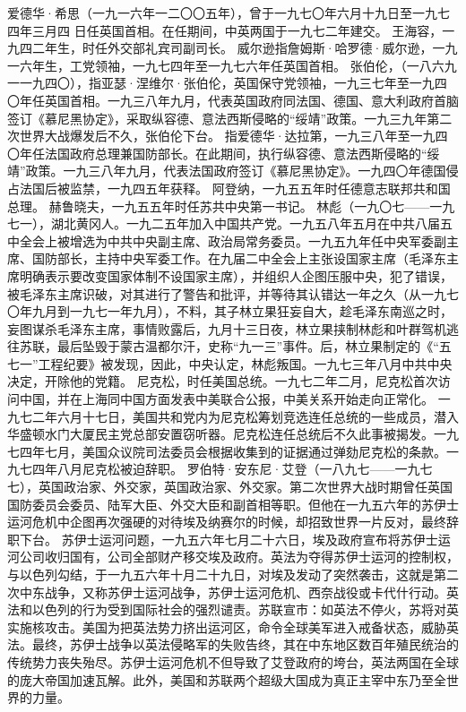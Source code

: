 \begin{maonote}
爱德华·希思（一九一六年一二〇〇五年），曾于一九七〇年六月十九日至一九七四年三月四 日任英国首相。在任期间，中英两国于一九七二年建交。
王海容，一九四二年生，时任外交部礼宾司副司长。
威尔逊指詹姆斯·哈罗德·威尔逊，一九一六年生，工党领袖，一九七四年至一九七六年任英国首相。
张伯伦，（一八六九一一九四〇），指亚瑟·涅维尔·张伯伦，英国保守党领袖，一九三七年至一九四〇年任英国首相。一九三八年九月，代表英国政府同法国、德国、意大利政府首脑签订《慕尼黑协定》，采取纵容德、意法西斯侵略的“绥靖”政策。一九三九年第二次世界大战爆发后不久，张伯伦下台。
指爱德华·达拉第，一九三八年至一九四〇年任法国政府总理兼国防部长。在此期间，执行纵容德、意法西斯侵略的“绥靖”政策。一九三八年九月，代表法国政府签订《慕尼黑协定》。一九四〇年德国侵占法国后被监禁，一九四五年获释。
阿登纳，一九五五年时任德意志联邦共和国总理。
赫鲁晓夫，一九五五年时任苏共中央第一书记。
林彪（一九〇七——一九七一），湖北黄冈人。一九二五年加入中国共产党。一九五八年五月在中共八届五中全会上被增选为中共中央副主席、政治局常务委员。一九五九年任中央军委副主席、国防部长，主持中央军委工作。在九届二中全会上主张设国家主席（毛泽东主席明确表示要改变国家体制不设国家主席），并组织人企图压服中央，犯了错误，被毛泽东主席识破，对其进行了警告和批评，并等待其认错达一年之久（从一九七〇年九月到一九七一年九月），不料，其子林立果狂妄自大，趁毛泽东南巡之时，妄图谋杀毛泽东主席，事情败露后，九月十三日夜，林立果挟制林彪和叶群驾机逃往苏联，最后坠毁于蒙古温都尔汗，史称“九一三”事件。后，林立果制定的《“五七一”工程纪要》被发现，因此，中央认定，林彪叛国。一九七三年八月中共中央决定，开除他的党籍。
尼克松，时任美国总统。一九七二年二月，尼克松首次访问中国，并在上海同中国方面发表中美联合公报，中美关系开始走向正常化。
一九七二年六月十七日，美国共和党内为尼克松筹划竞选连任总统的一些成员，潜入华盛顿水门大厦民主党总部安置窃听器。尼克松连任总统后不久此事被揭发。一九七四年七月，美国众议院司法委员会根据收集到的证据通过弹劾尼克松的条款。一九七四年八月尼克松被迫辞职。
罗伯特·安东尼·艾登（一八九七——一九七七），英国政治家、外交家，英国政治家、外交家。第二次世界大战时期曾任英国国防委员会委员、陆军大臣、外交大臣和副首相等职。但他在一九五六年的苏伊士运河危机中企图再次强硬的对待埃及纳赛尔的时候，却招致世界一片反对，最终辞职下台。
苏伊士运河问题，一九五六年七月二十六日，埃及政府宣布将苏伊士运河公司收归国有，公司全部财产移交埃及政府。英法为夺得苏伊士运河的控制权，与以色列勾结，于一九五六年十月二十九日，对埃及发动了突然袭击，这就是第二次中东战争，又称苏伊士运河战争，苏伊士运河危机、西奈战役或卡代什行动。英法和以色列的行为受到国际社会的强烈谴责。苏联宣市：如英法不停火，苏将对英实施核攻击。美国为把英法势力挤出运河区，命令全球美军进入戒备状态，威胁英法。最终，苏伊士战争以英法侵略军的失败告终，其在中东地区数百年殖民统治的传统势力丧失殆尽。苏伊士运河危机不但导致了艾登政府的垮台，英法两国在全球的庞大帝国加速瓦解。此外，美国和苏联两个超级大国成为真正主宰中东乃至全世界的力量。

\end{maonote}
